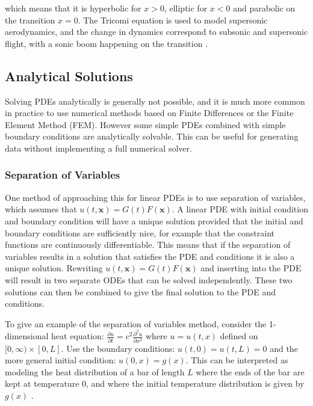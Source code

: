 \noindent which means that it is hyperbolic for $x > 0$, elliptic for $x < 0$ and parabolic on the transition $x = 0$. The Tricomi equation is used to model supersonic aerodynamics, and the change in dynamics correspond to subsonic and supersonic flight, with a sonic boom happening on the transition \cite{pdebookcourse2}.

\subsection{Analytical Solutions}

Solving PDEs analytically is generally not possible, and it is much more common in practice to use numerical methods based on Finite Differences or the Finite Element Method (FEM). However some simple PDEs combined with simple boundary conditions are analytically solvable. This can be useful for generating data without implementing a full numerical solver.

\subsubsection{Separation of Variables}

One method of approaching this for linear PDEs is to use separation of variables, which assumes that $u(t, \bm{x}) = G(t) F(\bm{x})$. A linear PDE with initial condition and boundary condition will have a unique solution provided that the initial and boundary conditions are sufficiently nice, for example that the constraint functions are continuously differentiable. This means that if the separation of variables results in a solution that satisfies the PDE and conditions it is also a unique solution. Rewriting $u(t, \bm{x}) = G(t) F(\bm{x})$ and inserting into the PDE will result in two separate ODEs that can be solved independently. These two solutions can then be combined to give the final solution to the PDE and conditions.

To give an example of the separation of variables method, consider the 1-dimensional heat equation: $\frac{\partial u}{\partial t} = c^2 \frac{\partial^2 u}{\partial x^2}$ where $u = u(t, x)$ defined on $[0, \infty) \times [0, L]$. Use the boundary conditions: $u(t, 0) = u(t, L) = 0$ and the more general initial condition: $u(0, x) = g(x)$. This can be interpreted as modeling the heat distribution of a bar of length $L$ where the ends of the bar are kept at temperature 0, and where the initial temperature distribution is given by $g(x)$ \cite{advancedengineeringmath}.

